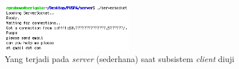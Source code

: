 \begin{figure}
\centering
\includegraphics[width=0.5\textwidth]{ServerOnClientTest}
\caption{Yang terjadi pada \textit{server} (sederhana) saat subsistem \textit{client} diuji}
\label{ServerOnClientTest}
\end{figure}
